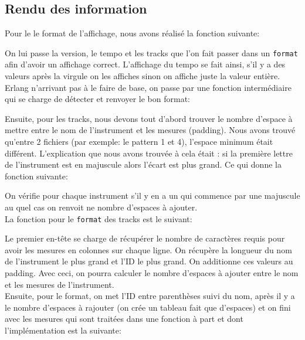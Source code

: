 \documentclass[10pt,a4paper]{article}
\begin{document}
\subsection{Rendu des information}

Pour le le format de l'affichage, nous avons réalisé la fonction suivante:



On lui passe la version, le tempo et les tracks que l'on fait passer dans un \texttt{format} afin d'avoir un affichage correct. L'affichage du tempo se fait ainsi, s'il y a des valeurs après la virgule on les affiches sinon on affiche juste la valeur entière. Erlang n'arrivant pas à le faire de base, on passe par une fonction intermédiaire qui se charge de détecter et renvoyer le bon format:



Ensuite, pour les tracks, nous devons tout d'abord trouver le nombre d'espace à mettre entre le nom de l'instrument et les mesures (padding). Nous avons trouvé qu'entre 2 fichiers (par exemple: le pattern 1 et 4), l'espace minimum était différent. L'explication que nous avons trouvée à cela était : si la première lettre de l'instrument est en majuscule alors l'écart est plus grand. Ce qui donne la fonction suivante:



On vérifie pour chaque instrument s'il y en a un qui commence par une majuscule au quel cas on renvoit ne nombre d'espaces à ajouter.\\

La fonction pour le \texttt{format} des tracks est le suivant:



Le premier en-tête se charge de récupérer le nombre de caractères requis pour avoir les mesures en colonnes sur chaque ligne. On récupère la longueur du nom de l'instrument le plus grand et l'ID le plus grand. On additionne ces valeurs au padding. Avec ceci, on pourra calculer le nombre d'espaces à ajouter entre le nom et les mesures de l'instrument.\\

Ensuite, pour le format, on met l'ID entre parenthèses suivi du nom, après il y a le nombre d'espaces à rajouter (on crée un tableau fait que d'espaces) et on fini avec les mesures qui sont traitées dans une fonction à part et dont l'implémentation est la suivante:
\end{document}
